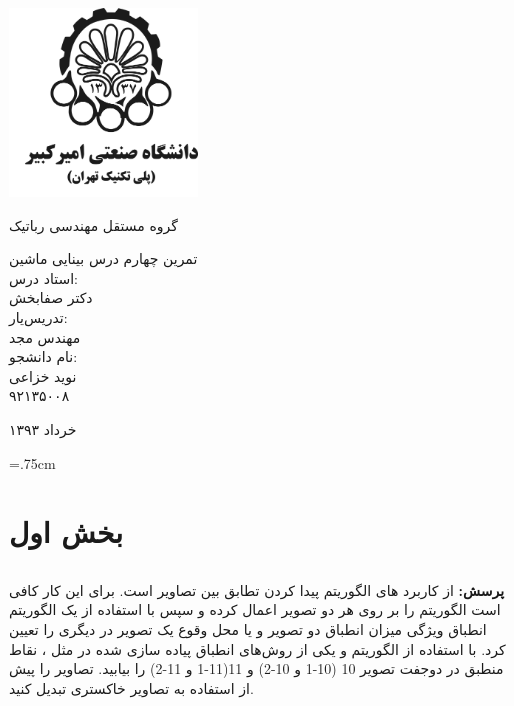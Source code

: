 \documentclass[12pt,a4paper]{article}
\theoremstyle{definition}
\theoremstyle{theorem}
\theoremstyle{definition}
\begin{document}
\thispagestyle{empty}
\vspace*{-28mm}
\centerline{\includegraphics[height=5cm]{logo.png}}
\begin{center}
\vspace{-2mm}
{\large \titr
گروه مستقل مهندسی رباتیک
\\[2.1cm]
}

{\Large \titr
تمرین چهارم درس بینایی ماشین
\\[2cm]
استاد درس:
\\[.5cm]
دکتر صفابخش
\\[1.5cm]
\large 
تدریس‌یار: 
\\[0.5cm]
مهندس مجد
\\[1.5cm]
نام دانشجو:
\\[.5cm]
نوید خزاعی
\\[.5cm]
۹۲۱۳۵۰۰۸
\\[1.5cm]
}
\baselineskip=1cm

{\large
خرداد ۱۳۹۳
}
\end{center}
\newpage
\baselineskip=1cm
\tableofcontents

\baselineskip=.75cm
\newpage 
\section{بخش اول}
\subsection{{}
}

\textbf{پرسش:}
 از کاربرد های الگوریتم  پیدا کردن تطابق بین تصاویر است. برای این کار کافی است الگوریتم  را بر روی هر دو تصویر اعمال کرده و سپس با استفاده از یک الگوریتم انطباق ویژگی میزان انطباق دو تصویر و یا محل وقوع یک تصویر در دیگری را تعیین کرد. با استفاده از الگوریتم  و یکی از روش‌های انطباق پیاده سازی شده در  مثل ، نقاط منطبق در دوجفت تصویر 10 (10-1 و 10-2) و 11(11-1 و 11-2) را بیابید. تصاویر را پیش از استفاده به تصاویر خاکستری تبدیل کنید.
\end{document}
